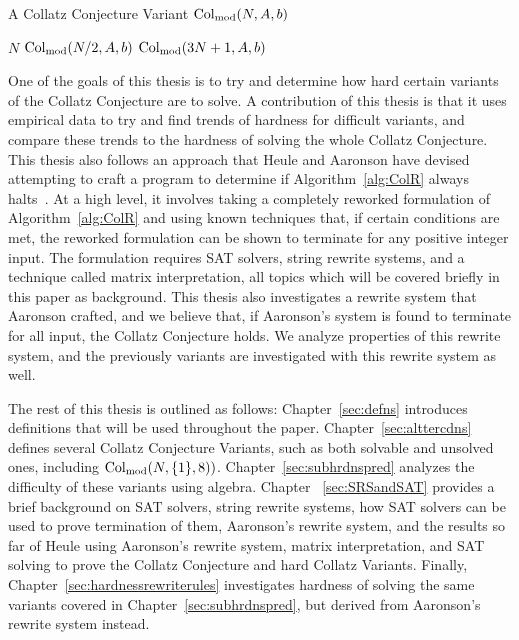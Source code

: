 \begin{algorithm} 
\caption{A Collatz Conjecture Variant $\mathrm{Col}_{\text{mod}}(N,A,b)$}
\label{alg:ColSP} 
\begin{algorithmic}[1]
     \Return $N$
    \EndIf
     \Return $\mathrm{Col}_{\text{mod}}(N/2,A,b)$
    \EndIf
    \State \Return $\mathrm{Col}_{\text{mod}}(3N+1,A,b)$ 
\end{algorithmic}
\end{algorithm}
One of the goals of this thesis is to try and determine how hard certain variants of the Collatz Conjecture are to solve. A contribution of this thesis is that it uses empirical data to try and find trends of hardness for difficult variants, and compare these trends to the hardness of solving the whole Collatz Conjecture. This thesis also follows an approach that Heule and Aaronson have devised attempting to craft a program to determine if Algorithm~\ref{alg:ColR} always halts~\cite{HeuleAaronson}. At a high level, it involves taking a completely reworked formulation of Algorithm~\ref{alg:ColR} and using known techniques that, if certain conditions are met, the reworked formulation can be shown to terminate for any positive integer input. The formulation requires SAT solvers, string rewrite systems, and a technique called matrix interpretation, all topics which will be covered briefly in this paper as background. This thesis also investigates a rewrite system that Aaronson crafted, and we believe that, if Aaronson's system is found to terminate for all input, the Collatz Conjecture holds. We analyze properties of this rewrite system, and the previously variants are investigated with this rewrite system as well.\par
The rest of this thesis is outlined as follows: Chapter~\ref{sec:defns} introduces definitions that will be used throughout the paper. Chapter~\ref{sec:alttercdns} defines several Collatz Conjecture Variants, such as both solvable and unsolved ones, including $\mathrm{Col}_{\text{mod}}(N,\{1\},8))$. Chapter~\ref{sec:subhrdnspred} analyzes the difficulty of these variants using algebra. Chapter ~\ref{sec:SRSandSAT} provides a brief background on SAT solvers, string rewrite systems, how SAT solvers can be used to prove termination of them, Aaronson's rewrite system, and the results so far of Heule using Aaronson's rewrite system, matrix interpretation, and SAT solving to prove the Collatz Conjecture and hard Collatz Variants. Finally, Chapter~\ref{sec:hardnessrewriterules} investigates hardness of solving the same variants covered in Chapter~\ref{sec:subhrdnspred}, but derived from Aaronson's rewrite system instead.